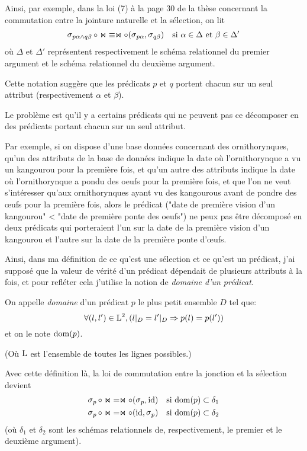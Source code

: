 Ainsi, par exemple, dans la loi (7) à la page 30 de la thèse
concernant la commutation entre la jointure naturelle et la
sélection,
on lit
\begin{align*}
\sel_{p\alpha \wedge q\beta} \circ \Join 
& \equiv \Join \circ (\sel_{p\alpha}, \sel_{q\beta})
& \text{si $\alpha \in \Delta$ et $\beta \in \Delta'$}
\end{align*}
où $\Delta$ et $\Delta'$ représentent respectivement le schéma relationnel
du premier argument et le schéma relationnel du deuxième argument.

Cette notation suggère que les prédicats $p$ et $q$ portent
chacun sur un seul attribut (respectivement $\alpha$ et $\beta$).

Le problème est qu'il y a certains prédicats qui ne peuvent
pas ce décomposer en des prédicats portant chacun sur un seul attribut.

Par exemple, si on dispose d'une base données concernant
des ornithorynques, qu'un des attributs de la base de données indique
la date où l'ornithorynque a vu un kangourou pour la première fois,
et qu'un autre des attributs indique la date où l'ornithorynque a pondu des oeufs
pour la première fois,
et que l'on ne veut s'intéresser qu'aux ornithorynques ayant vu des kangourous avant
de pondre des œufs pour la première fois, alors le prédicat
("date de première vision d'un kangourou" < "date de première ponte des oeufs")
ne peux pas être décomposé en deux prédicats qui porteraient l'un sur 
la date de la première vision d'un kangourou et l'autre sur la date de la 
première ponte d'œufs.

Ainsi, dans ma définition de ce qu'est une sélection et ce qu'est un prédicat,
j'ai supposé que la valeur de vérité d'un prédicat dépendait de plusieurs
attributs à la fois, et pour refléter cela j'utilise la notion de
\emph{domaine d'un prédicat}.

\begin{defi*}
On appelle \emph{domaine} d'un prédicat $p$ le plus petit
	ensemble $D$ tel que:
	$$
	\forall (l, l') \in \operatorname{L}^2, (l|_D = l'|_D \Rightarrow  p(l) = p(l')) 
	$$
	et on le note $\operatorname{dom}(p)$.
	
	(Où $\operatorname{L}$ est l'ensemble de toutes les lignes possibles.)
\end{defi*}

Avec cette définition là, la loi de commutation entre la jonction
et la sélection devient
\begin{align*}
\selP \circ \Join
& = \Join \circ (\selP, \id)
& \text{si $\dom(p) \subset \delta_1$}
\label{seljoin1}\\ 
\selP \circ \Join
& = \Join \circ (\id, \selP)
& \text{si $\dom(p) \subset \delta_2$}
\end{align*}
(où $\delta_1$ et $\delta_2$ sont les schémas relationnels de, respectivement,
le premier et le deuxième argument).

